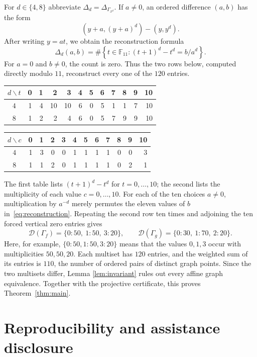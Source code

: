 \documentclass[11pt]{article}
\newcommand{\F}{\mathbb F}
\begin{document}
For $d\in\{4,8\}$ abbreviate
$\Delta_d=\Delta_{\Gamma_{x^d}}$.  If $a\ne0$, an ordered difference
$(a,b)$ has the form
\[
 (y+a,(y+a)^d)-(y,y^d).
\]
After writing $y=at$, we obtain the reconstruction formula
\begin{equation}\label{eq:reconstruction}
 \Delta_d(a,b)=
 \#\left\{t\in\F_{11}:(t+1)^d-t^d=b/a^d\right\}.
\end{equation}
For $a=0$ and $b\ne0$, the count is zero.  Thus the two rows below,
computed directly modulo $11$, reconstruct every one of the $120$ entries.

\begin{center}
{\small
\begin{tabular}{c|rrrrrrrrrrr}
$d\backslash t$&0&1&2&3&4&5&6&7&8&9&10\\ \hline
$4$&1&4&10&10&6&0&5&1&1&7&10\\
$8$&1&2&2&4&6&0&5&7&9&9&10
\end{tabular}
\par\medskip
\begin{tabular}{c|rrrrrrrrrrr}
$d\backslash c$&0&1&2&3&4&5&6&7&8&9&10\\ \hline
$4$&1&3&0&0&1&1&1&1&0&0&3\\
$8$&1&1&2&0&1&1&1&1&0&2&1
\end{tabular}
}
\end{center}

The first table lists $(t+1)^d-t^d$ for $t=0,\ldots,10$; the second
lists the multiplicity of each value $c=0,\ldots,10$.  For each of the ten
choices $a\ne0$, multiplication by $a^{-d}$ merely permutes the eleven
values of $b$ in~\eqref{eq:reconstruction}.  Repeating the second row ten
times and adjoining the ten forced vertical zero entries gives
\[
 \mathcal D(\Gamma_f)=\{0:50,\ 1:50,\ 3:20\},
 \qquad
 \mathcal D(\Gamma_g)=\{0:30,\ 1:70,\ 2:20\}.
\]
Here, for example, $\{0:50,1:50,3:20\}$ means that the values $0,1,3$
occur with multiplicities $50,50,20$.  Each multiset has $120$ entries,
and the weighted sum of its entries is $110$, the number of ordered pairs
of distinct graph points.  Since the two multisets differ, Lemma
\ref{lem:invariant} rules out every affine graph equivalence.  Together
with the projective certificate, this proves Theorem~\ref{thm:main}.

\section{Reproducibility and assistance disclosure}
\end{document}
